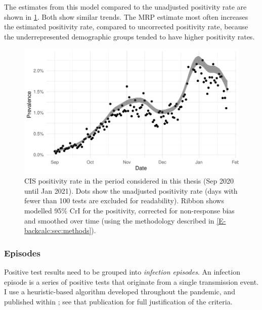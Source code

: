 \documentclass[thesis.tex]{subfiles}
\begin{document}
The estimates from this model compared to the unadjusted positivity rate are shown in \cref{biology-data:fig:CIS-positivity}.
Both show similar trends.
The MRP estimate most often increases the estimated positivity rate, compared to uncorrected positivity rate, because the underrepresented demographic groups tended to have higher positivity rates.

\begin{figure}
  \centering \includegraphics[width=\textwidth]{biology-data/CIS-positivity}
  \caption[CIS positivity]{%
    CIS positivity rate in the period considered in this thesis (Sep 2020 until Jan 2021).
    Dots show the unadjusted positivity rate (days with fewer than 100 tests are excluded for readability).
    Ribbon shows modelled 95\% CrI for the positivity, corrected for non-response bias and smoothed over time (using the methodology described in \cref{E-backcalc:sec:methods}).
  }
  \label{biology-data:fig:CIS-positivity}
\end{figure}


\subsubsection{Episodes}

Positive test results need to be grouped into \emph{infection episodes}.
An infection episode is a series of positive tests that originate from a single transmission event.
I use a heuristic-based algorithm developed throughout the pandemic, and published within \textcite{weiRisk}; see that publication for full justification of the criteria.
\end{document}
